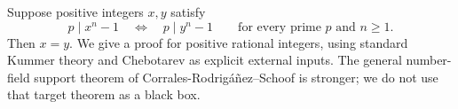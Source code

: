 Suppose positive integers $x,y$ satisfy
\[
 p\mid x^n-1\quad\Longleftrightarrow\quad p\mid y^n-1
 \qquad\text{for every prime }p\text{ and }n\ge1.
 \tag{1}
\]
Then $x=y$. We give a proof for positive rational integers, using standard Kummer theory and Chebotarev as explicit external inputs. The general number-field support theorem of Corrales-Rodrig\'a\~nez--Schoof is stronger; we do not use that target theorem as a black box.
